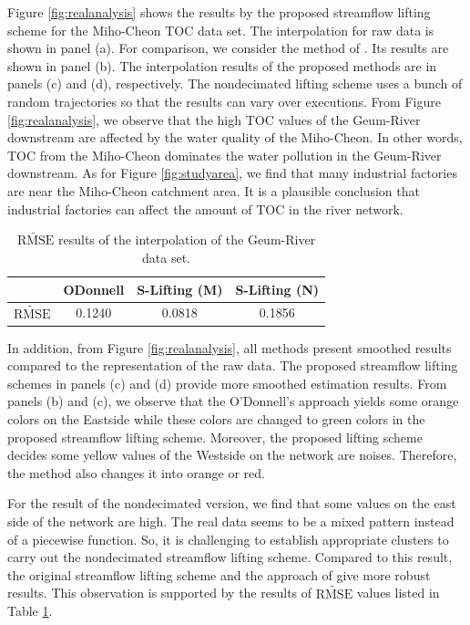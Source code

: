 \documentclass[11pt,titlepage]{article}
\begin{document}
Figure \ref{fig:realanalysis} shows the results by the proposed streamflow lifting scheme for the Miho-Cheon TOC data set. The interpolation for raw data is shown in panel (a). For comparison, we consider the method of \cite{ODonnell2014}. Its results are shown in panel (b). The interpolation results of the proposed methods are in panels (c) and (d), respectively. The nondecimated lifting scheme uses a bunch of random trajectories so that the results can vary over executions. From Figure \ref{fig:realanalysis}, we observe that the high TOC values of the Geum-River downstream are affected by the water quality of the Miho-Cheon. In other words, TOC from the Miho-Cheon dominates the water pollution in the Geum-River downstream. As for Figure \ref{fig:studyarea}, we find that many industrial factories are near the Miho-Cheon catchment area. It is a plausible conclusion that industrial factories can affect the amount of TOC in the river network.

\begin{table}[]
	\centering
	\caption{$\widetilde{\text{RMSE}}$ results of the interpolation of the Geum-River data set.}
	\begin{tabular}{|c|c|c|c|}
		\hline
		& ODonnell & S-Lifting (M) & S-Lifting (N) \\ \hline
		$\widetilde{\text{RMSE}}$ & 0.1240   & 0.0818        & 0.1856        \\ \hline
	\end{tabular}
	\label{table:realanalysis}
\end{table}

In addition, from Figure \ref{fig:realanalysis}, all methods present smoothed results compared to the representation of the raw data. The proposed streamflow lifting schemes in panels (c) and (d) provide more smoothed estimation results. From panels (b) and (c), we observe that the O'Donnell's approach yields some orange colors on the Eastside while these colors are changed to green colors in the proposed streamflow lifting scheme. {\color{red}Moreover, the proposed lifting scheme decides some yellow values of the Westside on the network are noises. Therefore, the method also changes it into orange or red.}

For the result of the nondecimated version, we find that some values on the east side of the network are high. The real data seems to be a mixed pattern instead of a piecewise function. So, it is challenging to establish appropriate clusters to carry out  the nondecimated streamflow lifting scheme. Compared to this result, the original streamflow lifting scheme and the approach of \cite{ODonnell2014} give more robust results. This observation is supported by the results of  $\widetilde{\text{RMSE}}$ values listed in Table \ref{table:realanalysis}. 
\end{document}
